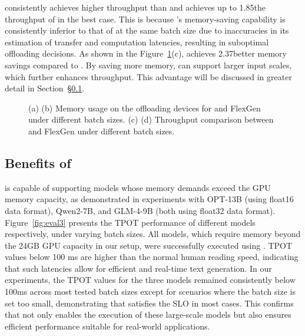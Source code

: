 \sys consistently achieves higher throughput than \flexgen and achieves up to 1.85\X the throughput of \flexgen in the best case. 
This is because \flexgen's memory-saving capability is consistently inferior to that of \sys at the same batch size 
due to inaccuracies in its estimation of transfer and computation latencies, 
resulting in suboptimal offloading decisions. As shown in the Figure~\ref{fig:eval2}(c), \sys achieves 2.37\X better memory savings compared to \flexgen. 
By saving more memory, \sys can support larger input scales, which further enhances throughput. 
This advantage will be discussed in greater detail in Section~\S\ref{sec:benefits}.

\begin{figure}[t]
    \centering
    \resizebox{\columnwidth}{!}{
 }
    \caption{(a) (b) Memory usage on the offloading devices for \sys and FlexGen under different batch sizes. 
 (c) (d) Throughput comparison between \sys and FlexGen under different batch sizes.}
    \label{fig:eval2}
\end{figure}

\subsection{Benefits of \sys}
\label{sec:benefits}

\sys is capable of supporting models whose memory demands exceed the GPU memory capacity, as demonstrated in experiments with OPT-13B (using float16 data format), 
Qwen2-7B, and GLM-4-9B (both using float32 data format).
Figure~\ref{fig:eval3} presents the TPOT performance of different models respectively, under varying batch sizes. All models, 
which require memory beyond the 24GB GPU capacity in our setup, were successfully executed using \sys. 
TPOT values below 100 ms are higher than the normal human reading speed, indicating that such latencies allow for efficient and real-time text generation. 
In our experiments, the TPOT values for the three models remained consistently below 100ms across most tested batch sizes except for scenarios where the batch size 
is set too small, demonstrating that \sys satisfies the SLO in most cases.
This confirms that \sys not only enables the execution of these large-scale models but also ensures efficient performance suitable for real-world applications.

